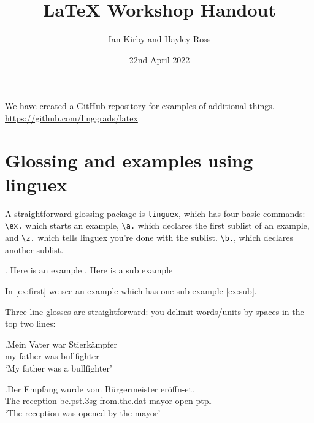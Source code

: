 \documentclass[letterpaper]{article}
\title{LaTeX Workshop Handout}
\author{Ian Kirby and Hayley Ross}
\date{22nd April 2022}
\begin{document}
\maketitle

We have created a GitHub repository for examples of additional things. \href{https://github.com/linggrads/latex}{https://github.com/linggrads/latex}

\tableofcontents %



\section{Glossing and examples using linguex}

A straightforward glossing package is \texttt{linguex}, which has four basic commands: \texttt{\textbackslash ex.} which starts an example, \texttt{\textbackslash a.} which declares the first sublist of an example, and \texttt{\textbackslash z.} which tells linguex you're done with the sublist. \texttt{\textbackslash b.}, which declares another sublist.%

\ex. Here is an example\label{ex:first}
	\a. Here is a sub example\label{ex:sub}
	
In \ref{ex:first} we see an example which has one sub-example \ref{ex:sub}.


Three-line glosses are straightforward: you delimit words/units by spaces in the top two lines:

\exg.Mein Vater war Stierk\"ampfer \label{german bullfighter}\\ %
my father was bullfighter\\
`My father was a bullfighter'

\exg.Der Empfang wurde vom B\"{u}rgermeister er\"{o}ffn-et.\\ %
The reception be.{\sc pst.3sg} from.{\sc the.dat} mayor open-{\sc ptpl}\\
`The reception was opened by the mayor'
\end{document}
